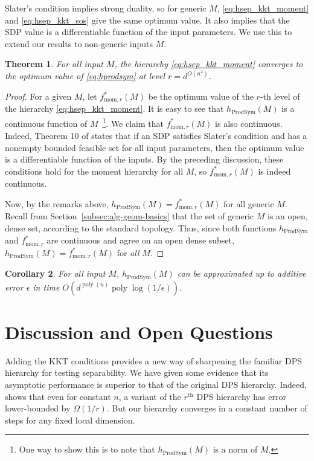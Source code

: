 \documentclass[aps,pra,notitlepage,preprintnumbers,11pt,tightenlines]{revtex4-1}
\DeclareMathOperator{\ProdSym}{ProdSym}
\DeclareMathOperator{\poly}{poly}
\newtheorem{theorem}{Theorem}
\newtheorem{corollary}[theorem]{Corollary}
\begin{document}
Slater's condition implies strong duality, so for generic $M$,
\eqref{eq:hsep_kkt_moment} and \eqref{eq:hsep_kkt_sos} give the same
optimum value. It also implies that the SDP value is a differentiable
function of the input parameters. We use this to extend our results to
non-generic inputs $M$.
\begin{theorem}
  For all input $M$, the hierarchy \eqref{eq:hsep_kkt_moment} converges to the optimum
  value of \eqref{eq:hprodsym} at level
  $r = d^{O(n^2)}$.
\end{theorem}
\begin{proof}
  For a given $M$, let $f^*_{\text{mom}, r}(M)$ be the optimum value of
  the $r$-th level of the hierarchy \eqref{eq:hsep_kkt_moment}. It is
  easy to see that $h_{\ProdSym}(M)$ is a continuous function of
  $M$~\footnote{One way to show this is to note that $h_{\ProdSym}(M)$ is a
    norm of $M$.}. We claim
  that $f^*_{\text{mom},r}(M)$ is also continuous. Indeed, Theorem 10 of
  \cite{shapiro:1997} states that if an SDP satisfies Slater's
  condition and has a nonempty bounded feasible set for all input
  parameters, then the optimum value is a differentiable function of
  the inputs. By the preceding discussion, these conditions hold for the moment hierarchy for all
  $M$, so $f^*_{\text{mom},r}(M)$ is indeed continuous.

  Now, by the remarks above, $h_{\ProdSym}(M) = f^*_{\text{mom},r}(M)$ for all generic
  $M$. Recall from Section~\ref{subsec:alg-geom-basics} that the set
  of generic $M$ is an open, dense set, according to the standard
  topology. Thus, since both functions $h_{\ProdSym}$ and $f^*_{\text{mom},r}$ are continuous and agree on an
  open dense subset, $h_{\ProdSym}(M)
  = f^*_{\text{mom},r}(M)$ for \emph{all} $M$. 
\end{proof}
\begin{corollary}
  For all input $M$, $h_{\ProdSym}(M)$ can be approximated up to
  additive error $\epsilon$ in time $O(d^{\poly(n)} \poly\log(1/\epsilon))$.
\end{corollary}

\section{Discussion and Open Questions}

Adding the KKT conditions provides a new way of sharpening the
familiar DPS hierarchy for testing separability.  We have given some
evidence that its asymptotic performance is superior to that of the
original DPS hierarchy.    Indeed, \cite{SO12} shows that even for
constant $n$, a variant of the $r^{\text{th}}$ DPS hierarchy has error
lower-bounded by $\Omega(1/r)$.  But our hierarchy converges in a
constant number of steps for any fixed local dimension. 
\end{document}
